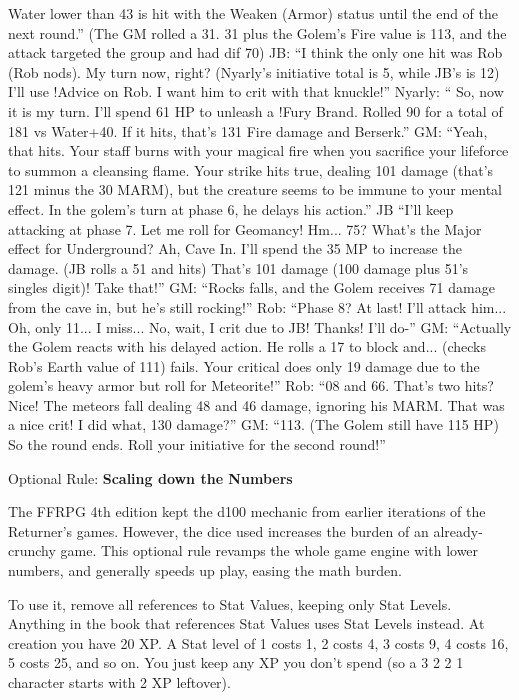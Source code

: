 \begin{multicols}{2}
Water lower than 43 is hit with the Weaken (Armor)
status until the end of the next round.” (The GM rolled a
31. 31 plus the Golem's Fire value is 113, and the attack
targeted the group and had dif 70)
JB: “I think the only one hit was Rob (Rob nods).
My turn now, right? (Nyarly's initiative total is 5, while
JB's is 12) I'll use !Advice on Rob. I want him to crit with
that knuckle!”
Nyarly: “ So, now it is my turn. I'll spend 61 HP
to unleash a !Fury Brand. Rolled 90 for a total of 181 vs
Water+40. If it hits, that's 131 Fire damage and Berserk.”
GM: “Yeah, that hits. Your staff burns with your
magical fire when you sacrifice your lifeforce to summon
a cleansing flame. Your strike hits true, dealing 101
damage (that's 121 minus the 30 MARM), but the
creature seems to be immune to your mental effect. In the
golem's turn at phase 6, he delays his action.”
JB “I'll keep attacking at phase 7. Let me roll for
Geomancy! Hm... 75? What’s the Major effect for
Underground? Ah, Cave In. I'll spend the 35 MP to
increase the damage. (JB rolls a 51 and hits) That's 101
damage (100 damage plus 51's singles digit)! Take that!”
GM: “Rocks falls, and the Golem receives 71
damage from the cave in, but he's still rocking!”
Rob: “Phase 8? At last! I'll attack him... Oh, only
11... I miss... No, wait, I crit due to JB! Thanks! I'll do-”
GM: “Actually the Golem reacts with his delayed
action. He rolls a 17 to block and... (checks Rob's Earth
value of 111) fails. Your critical does only 19 damage due
to the golem's heavy armor but roll for Meteorite!”
Rob: “08 and 66. That's two hits? Nice! The
meteors fall dealing 48 and 46 damage, ignoring his
MARM. That was a nice crit! I did what, 130 damage?”
GM: “113. (The Golem still have 115 HP) So the
round ends. Roll your initiative for the second round!”

Optional Rule: \textbf{Scaling down the Numbers}

The FFRPG 4th edition kept the d100
mechanic from earlier iterations of the
Returner’s games. However, the dice used
increases the burden of an already-crunchy game.
This optional rule revamps the whole game
engine with lower numbers, and generally speeds
up play, easing the math burden.

To use it, remove all references to Stat
Values, keeping only Stat Levels. Anything in the
book that references Stat Values uses Stat Levels
instead. At creation you have 20 XP. A Stat level
of 1 costs 1, 2 costs 4, 3 costs 9, 4 costs 16, 5 costs
25, and so on. You just keep any XP you don't
spend (so a 3 2 2 1 character starts with 2 XP
leftover).


\end{multicols}

